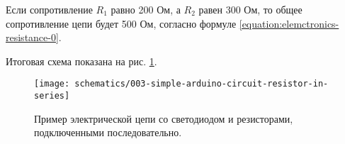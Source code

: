 \documentclass[../sparc.tex]{subfiles}
\begin{document}
Если сопротивление $R_1$ равно 200 Ом, а $R_2$ равен 300 Ом, то общее
сопротивление цепи будет 500 Ом, согласно формуле
\ref{equation:elemctronics-resistance-0}.

Итоговая схема показана на рис.
\ref{fig:breadboard-simple-arduino-circuit-resistor-in-series}.

\begin{figure}[ht]
  \centering
  \texttt{[image: schematics/003-simple-arduino-circuit-resistor-in-series]}
  \caption{Пример электрической цепи со светодиодом и резисторами, подключенными
    последовательно.}
  \label{fig:breadboard-simple-arduino-circuit-resistor-in-series}
\end{figure}
\end{document}
